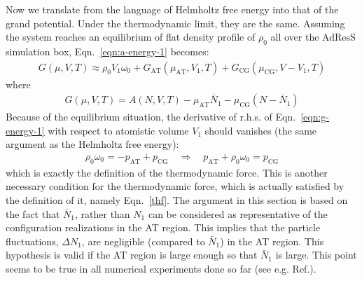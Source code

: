 \documentclass[aip,jcp,a4paper,reprint,onecolumn]{revtex4-1}
\newcommand{\AT}{{\textrm{{AT}}}}
\newcommand{\CG}{{\textrm{CG}}}
\begin{document}
\noindent
Now we translate from the language of Helmholtz free
energy into that of the grand potential.
Under the thermodynamic limit, they are the same.
Assuming the system reaches an
equilibrium of flat density profile of $\rho_0$ all over the AdResS simulation box, 
Eqn.~\eqref{eqn:a-energy-1} becomes:
\begin{align}\label{eqn:g-energy-1}
  G(\mu, V, T) \approx
  \rho_0V_1\omega_0
  + G_{\AT}(\mu_{\AT}, V_1, T) + G_{\CG}(\mu_{\CG}, V - V_1, T)
\end{align}
where
\begin{align}
  G(\mu, V, T) = A(N, V, T) - \mu_{\AT} \bar N_1 - \mu_{\CG}(N - \bar N_1)
\end{align}
Because of the equilibrium situation, the derivative of r.h.s. of
Eqn.~\eqref{eqn:g-energy-1} with respect to atomistic volume $V_1$
should vanishes (the same argument as the Helmholtz free energy):
\begin{align}
  \rho_0\omega_0 = -p_{\AT}+p_{\CG} \quad\Longrightarrow\quad
  p_{\AT} + \rho_0\omega_0 = p_{\CG}
\end{align}
which is exactly the definition of the thermodynamic force.
This is another necessary condition for the
thermodynamic force, which is actually satisfied by the definition of it,
namely Eqn.~\eqref{thf}.
The argument in this section is based on the fact that $\bar N_{1}$, rather than $N_{1}$ can be considered as representative of the configuration realizations in the AT region. This implies that the particle fluctuations, $\Delta N_{1}$,
are negligible (compared to $\bar N_{1}$) in the AT region. This hypothesis is valid if the AT region is large enough so that $\bar N_{1}$ is large. This point seems to be true in all numerical experiments done so far (see e.g. Ref.\cite{debash}).
\end{document}
